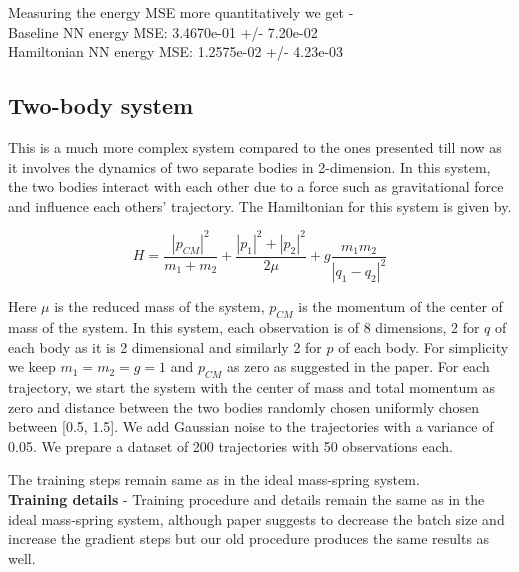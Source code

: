 Measuring the energy MSE more quantitatively we get -\\
Baseline NN energy MSE: 3.4670e-01 +/- 7.20e-02\\
Hamiltonian NN energy MSE: 1.2575e-02 +/- 4.23e-03

\subsection{Two-body system}
This is a much more complex system compared to the ones presented till now as it involves the dynamics of two separate bodies in 2-dimension. In this system, the two bodies interact with each other due to a force such as gravitational force and influence each others' trajectory. The Hamiltonian for this system is given by.

\begin{equation}
H = \frac{|p_{CM}|^2}{m_1 + m_2} + \frac{|p_1|^2 + |p_2|^2}{2\mu} + g\frac{m_1m_2}{|q_1-q_2|^2}
\end{equation}

Here \(\mu\) is the reduced mass of the system, \(p_{CM}\) is the momentum of the center of mass of the system. In this system, each observation is of 8 dimensions, 2 for \(q\) of each body as it is 2 dimensional and similarly 2 for \(p\) of each body. For simplicity we keep \(m_1 = m_2 = g = 1\) and \(p_{CM}\) as zero as suggested in the paper.
For each trajectory, we start the system with the center of mass and total momentum as zero and distance between the two bodies randomly chosen uniformly chosen between [0.5, 1.5]. We add Gaussian noise to the trajectories with a variance of 0.05. We prepare a dataset of 200 trajectories with 50 observations each.

The training steps remain same as in the ideal mass-spring system.\\
\textbf{Training details} - Training procedure and details remain the same as in the ideal mass-spring system, although paper suggests to decrease the batch size and increase the gradient steps but our old procedure produces the same results as well.

